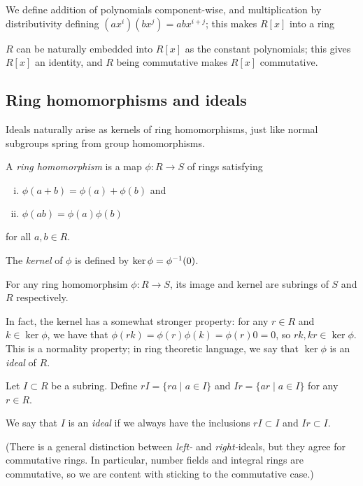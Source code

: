 We define addition of polynomials component-wise, and multiplication by distributivity defining $(ax^i)(bx^j)=abx^{i+j}$; this makes $R[x]$ into a ring

$R$ can be naturally embedded into $R[x]$ as the constant polynomials; this gives $R[x]$ an identity, and $R$ being commutative makes $R[x]$ commutative.



\subsection{Ring homomorphisms and ideals}

Ideals naturally arise as kernels of ring homomorphisms, just like normal subgroups spring from group homomorphisms.

\begin{defn}
	A \emph{ring homomorphism} is a map $\phi:R\to S$ of rings satisfying
	\begin{enumerate}[(i)]
		\item $\phi(a+b)=\phi(a)+\phi(b)$ and
		\item $\phi(ab)=\phi(a)\phi(b)$
	\end{enumerate}
	for all $a,b\in R$.

	The \emph{kernel} of $\phi$ is defined by $\ker\phi=\phi^{-1}(0)$.
\end{defn}

\begin{prop}
	For any ring homomorphsim $\phi:R\to S$, its image and kernel are subrings of $S$ and $R$ respectively.
\end{prop}

In fact, the kernel has a somewhat stronger property: for any $r\in R$ and $k\in\ker\phi$, we have that $\phi(rk)=\phi(r)\phi(k)=\phi(r)0=0$, so $rk,kr\in\ker\phi$. This is a normality property; in ring theoretic language, we say that $\ker\phi$ is an \emph{ideal} of $R$.

\begin{defn}
	Let $I\subset R$ be a subring. Define $rI=\{ra \mid a\in I\}$ and $Ir=\{ar \mid a\in I\}$ for any $r\in R$.

	We say that $I$ is an \emph{ideal} if we always have the inclusions $rI\subset I$ and $Ir\subset I$.
\end{defn}

(There is a general distinction between \emph{left-} and \emph{right-}ideals, but they agree for commutative rings. In particular, number fields and integral rings are commutative, so we are content with sticking to the commutative case.)

